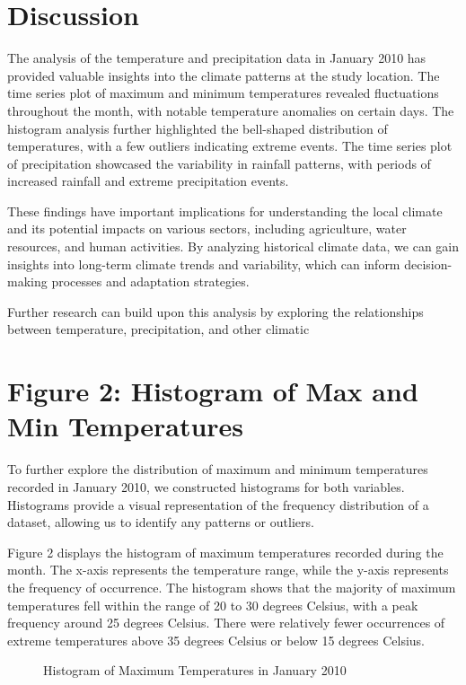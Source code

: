 \documentclass{article}
\begin{document}
{\section{Discussion}

The analysis of the temperature and precipitation data in January 2010 has provided valuable insights into the climate patterns at the study location. The time series plot of maximum and minimum temperatures revealed fluctuations throughout the month, with notable temperature anomalies on certain days. The histogram analysis further highlighted the bell-shaped distribution of temperatures, with a few outliers indicating extreme events. The time series plot of precipitation showcased the variability in rainfall patterns, with periods of increased rainfall and extreme precipitation events.

These findings have important implications for understanding the local climate and its potential impacts on various sectors, including agriculture, water resources, and human activities. By analyzing historical climate data, we can gain insights into long-term climate trends and variability, which can inform decision-making processes and adaptation strategies.

Further research can build upon this analysis by exploring the relationships between temperature, precipitation, and other climatic
\section{Figure 2: Histogram of Max and Min Temperatures}

To further explore the distribution of maximum and minimum temperatures recorded in January 2010, we constructed histograms for both variables. Histograms provide a visual representation of the frequency distribution of a dataset, allowing us to identify any patterns or outliers.

Figure 2 displays the histogram of maximum temperatures recorded during the month. The x-axis represents the temperature range, while the y-axis represents the frequency of occurrence. The histogram shows that the majority of maximum temperatures fell within the range of 20 to 30 degrees Celsius, with a peak frequency around 25 degrees Celsius. There were relatively fewer occurrences of extreme temperatures above 35 degrees Celsius or below 15 degrees Celsius.

\begin{figure}[h]
  \centering
  \caption{Histogram of Maximum Temperatures in January 2010}
  \label{fig:hist_max_temp}
\end{figure}

}
\end{document}
